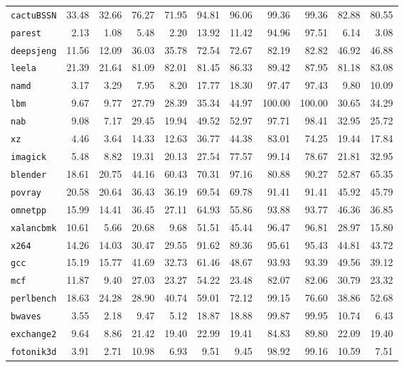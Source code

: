 \documentclass[10pt,a4paper]{article}
\newcommand{\ct}[1]{\texttt{#1}}
\begin{document}
{\begin{longtable}{@{}lrrrrrrrrrr@{}}
\midrule
\endhead
\bottomrule
\endlastfoot
\ct{cactuBSSN} & 33.48 & 32.66 & 76.27 & 71.95 & 94.81 & 96.06 & 99.36 & 99.36 & 82.88 & 80.55 \\
\ct{parest} & 2.13 & 1.08 & 5.48 & 2.20 & 13.92 & 11.42 & 94.96 & 97.51 & 6.14 & 3.08 \\
\ct{deepsjeng} & 11.56 & 12.09 & 36.03 & 35.78 & 72.54 & 72.67 & 82.19 & 82.82 & 46.92 & 46.88 \\
\ct{leela} & 21.39 & 21.64 & 81.09 & 82.01 & 81.45 & 86.33 & 89.42 & 87.95 & 81.18 & 83.08 \\
\ct{namd} & 3.17 & 3.29 & 7.95 & 8.20 & 17.77 & 18.30 & 97.47 & 97.43 & 9.80 & 10.09 \\
\ct{lbm} & 9.67 & 9.77 & 27.79 & 28.39 & 35.34 & 44.97 & 100.00 & 100.00 & 30.65 & 34.29 \\
\ct{nab} & 9.08 & 7.17 & 29.45 & 19.94 & 49.52 & 52.97 & 97.71 & 98.41 & 32.95 & 25.72 \\
\ct{xz} & 4.46 & 3.64 & 14.33 & 12.63 & 36.77 & 44.38 & 83.01 & 74.25 & 19.44 & 17.84 \\
\ct{imagick} & 5.48 & 8.82 & 19.31 & 20.13 & 27.54 & 77.57 & 99.14 & 78.67 & 21.81 & 32.95 \\
\ct{blender} & 18.61 & 20.75 & 44.16 & 60.43 & 70.31 & 97.16 & 80.88 & 90.27 & 52.87 & 65.35 \\
\ct{povray} & 20.58 & 20.64 & 36.43 & 36.19 & 69.54 & 69.78 & 91.41 & 91.41 & 45.92 & 45.79 \\
\ct{omnetpp} & 15.99 & 14.41 & 36.45 & 27.11 & 64.93 & 55.86 & 93.88 & 93.77 & 46.36 & 36.85 \\
\ct{xalancbmk} & 10.61 & 5.66 & 20.68 & 9.68 & 51.51 & 45.44 & 96.47 & 96.81 & 28.97 & 15.80 \\
\ct{x264} & 14.26 & 14.03 & 30.47 & 29.55 & 91.62 & 89.36 & 95.61 & 95.43 & 44.81 & 43.72 \\
\ct{gcc} & 15.19 & 15.77 & 41.69 & 32.73 & 61.46 & 48.67 & 93.93 & 93.39 & 49.56 & 39.12 \\
\ct{mcf} & 11.87 & 9.40 & 27.03 & 23.27 & 54.22 & 23.48 & 82.07 & 82.06 & 30.79 & 23.32 \\
\ct{perlbench} & 18.63 & 24.28 & 28.90 & 40.74 & 59.01 & 72.12 & 99.15 & 76.60 & 38.86 & 52.68 \\
\ct{bwaves} & 3.55 & 2.18 & 9.47 & 5.12 & 18.87 & 18.88 & 99.87 & 99.95 & 10.74 & 6.43 \\
\ct{exchange2} & 9.64 & 8.86 & 21.42 & 19.40 & 22.99 & 19.41 & 84.83 & 89.80 & 22.09 & 19.40 \\
\ct{fotonik3d} & 3.91 & 2.71 & 10.98 & 6.93 & 9.51 & 9.45 & 98.92 & 99.16 & 10.59 & 7.51 \\

\end{longtable}}
\end{document}
